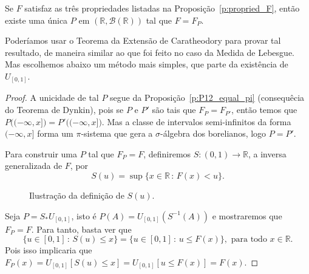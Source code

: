 \begin{theorem}
  \label{t:existe_prob_R}
  Se $F$ satisfaz as três propriedades listadas na Proposição~\ref{p:propried_F}, então existe uma única $P$ em $(\mathbb{R}, \mathcal{B}(\mathbb{R}))$ tal que $F = F_P$.
\end{theorem}

Poderíamos usar o Teorema da Extensão de Caratheodory para provar tal resultado, de maneira similar ao que foi feito no caso da Medida de Lebesgue.
Mas escolhemos abaixo um método mais simples, que parte da existência de $U_{[0,1]}$.

\begin{proof}
  A unicidade de tal $P$ segue da Proposição~\ref{p:P12_equal_pi} (consequêcia do Teorema de Dynkin), pois se $P$ e $P'$ são tais que $F_{P} = F_{P'}$, então temos que $P\big( (-\infty, x] \big) = P'\big( (-\infty, x] \big)$.
  Mas a classe de intervalos semi-infinitos da forma $(-\infty, x]$ forma um $\pi$-sistema que gera a $\sigma$-álgebra dos borelianos, logo $P = P'$.

  Para construir uma $P$ tal que $F_P = F$, definiremos $S:(0,1) \to \mathbb{R}$, a inversa generalizada de $F$, por
  \begin{equation}
    S(u) = \sup \{x \in \mathbb{R} \, : \,  F(x) < u\}.
  \end{equation}
  \begin{figure}[tb]
    \centering
    \caption{\small Ilustração da definição de $S(u)$.}
    \label{f:Rk_good}
  \end{figure}

  Seja $P = S_* U_{[0,1]}$, isto é $P(A) = U_{[0,1]}(S^{-1}(A))$ e mostraremos que $F_P = F$.
  Para tanto, basta ver que
  \begin{equation}
    \label{e:pseudo_inversa}
    \{u \in [0,1] \, : \,  S(u) \leq x\} = \{u \in [0,1] \, : \,  u \leq F(x)\}, \text{ para todo $x \in \mathbb{R}$}.
  \end{equation}
  Pois isso implicaria que $F_P(x) = U_{[0,1]}[S(u) \leq x] = U_{[0,1]} [u \leq F(x)] = F(x)$.


\end{proof}
